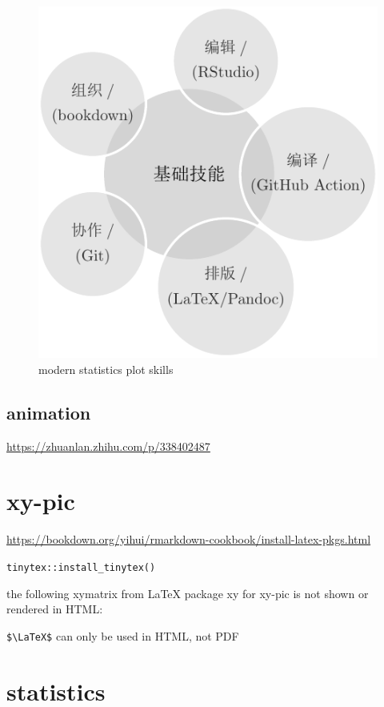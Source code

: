 \documentclass[
]{book}
\theoremstyle{definition}
\theoremstyle{definition}
\theoremstyle{definition}
\theoremstyle{definition}
\theoremstyle{remark}
\begin{document}
\begin{figure}
\includegraphics[width=0.65\linewidth]{202401311000-TikZ_files/figure-latex/skills-1} \caption{modern statistics plot skills}\label{fig:skills}
\end{figure}

\hypertarget{animation}{%
\section{animation}\label{animation}}

\url{https://zhuanlan.zhihu.com/p/338402487}

\hypertarget{xy-pic}{%
\chapter{xy-pic}\label{xy-pic}}

\url{https://bookdown.org/yihui/rmarkdown-cookbook/install-latex-pkgs.html}

\texttt{tinytex::install\_tinytex()}

the following xymatrix from LaTeX package xy for xy-pic is not shown or rendered in HTML:

\texttt{\$\textbackslash{}LaTeX\$} can only be used in HTML, not PDF


\hypertarget{statistics}{%
\chapter{statistics}\label{statistics}}
\end{document}

